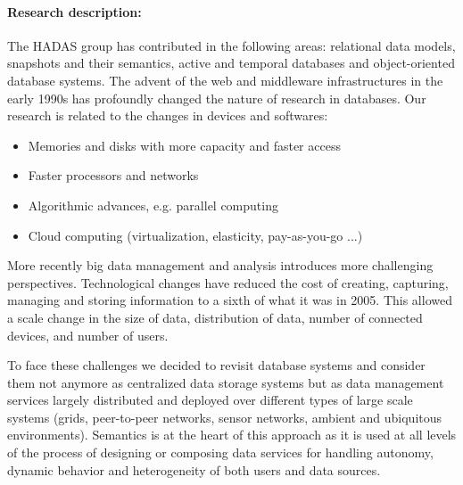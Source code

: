 \paragraph{Research description:}

The HADAS group has contributed in the following areas: relational data models, snapshots and their semantics, active and temporal databases and object-oriented database systems. The advent of the web and middleware infrastructures in the early 1990s has profoundly changed the nature of research in databases. 
Our research is related to the changes in devices and softwares:
\begin{itemize}
\item Memories and disks with more capacity and faster access
\item Faster processors and networks
\item Algorithmic advances, e.g. parallel computing
\item Cloud computing (virtualization, elasticity, pay-as-you-go ...)
\end{itemize}

More recently big data management and analysis introduces  more challenging perspectives. Technological changes have reduced the cost of creating, capturing, managing and storing information to a sixth of what it was in 2005. This allowed a scale change in the size of data, distribution of data, number of connected devices, and number of users. 


To face these challenges we decided to revisit database systems and consider them not anymore as centralized data storage systems but as data management services largely distributed and deployed over different types of large scale systems (grids, peer-to-peer networks, sensor networks, ambient and ubiquitous environments). 
Semantics is at the heart of this approach as it is used at all levels of the process of designing or composing data services for handling autonomy, dynamic behavior and heterogeneity of both users and data sources. 

